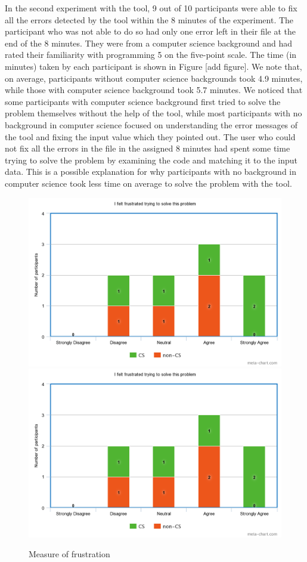 \documentclass[10pt]{report}
\begin{document}
In the second experiment with the tool, 9 out of 10 participants were able to fix all the errors detected by the tool within the 8 minutes of the experiment. The participant who was not able to do so had only one error left in their file at the end of the 8 minutes. They were from a computer science background and had rated their familiarity with programming 5 on the five-point scale. The time (in minutes) taken by each participant is shown in Figure [add figure]. We note that, on average, participants without computer science backgrounds took 4.9 minutes, while those with computer science background took 5.7 minutes. We noticed that some participants with computer science background first tried to solve the problem themselves without the help of the tool, while most participants with no background in computer science focused on understanding the error messages of the tool and fixing the input value which they pointed out. The user who could not fix all the errors in the file in the assigned 8 minutes had spent some time trying to solve the problem by examining the code and matching it to the input data. This is a possible explanation for why participants with no background in computer science took less time on average to solve the problem with the tool. 

\begin{figure} [H]
	\includegraphics[width=\linewidth]{frust1} 
	\includegraphics[width=\linewidth]{frust2} 
	\caption{Measure of frustration}
	\label{frustration}%
\end{figure}
\end{document}
